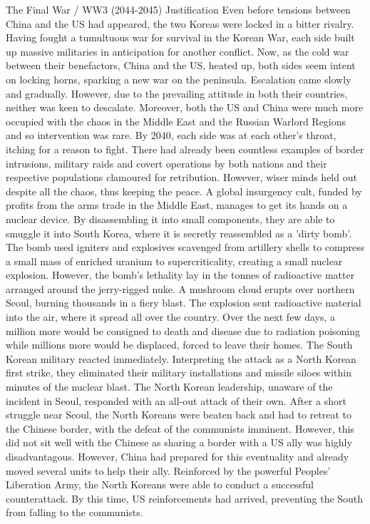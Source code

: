     The Final War / WW3 (2044-2045)
        Justification
            Even before tensions between China and the US had appeared, the two Koreas were locked in a bitter rivalry. Having fought a tumultuous war for survival in the Korean War, each side built up massive militaries in anticipation for another conflict. Now, as the cold war between their benefactors, China and the US, heated up, both sides seem intent on locking horns, sparking a new war on the peninsula.
            Escalation came slowly and gradually. However, due to the prevailing attitude in both their countries, neither was keen to descalate. Moreover, both the US and China were much more occupied with the chaos in the Middle East and the Russian Warlord Regions and so intervention was rare.
            By 2040, each side was at each other's throat, itching for a reason to fight. There had already been countless examples of border intrusions, military raids and covert operations by both nations and their respective populations clamoured for retribution. However, wiser minds held out despite all the chaos, thus keeping the peace.
            A global insurgency cult, funded by profits from the arms trade in the Middle East, manages to get its hands on a nuclear device. By disassembling it into small components, they are able to smuggle it into South Korea, where it is secretly reassembled as a 'dirty bomb'. The bomb used igniters and explosives scavenged from artillery shells to compress a small mass of enriched uranium to supercriticality, creating a small nuclear explosion. However, the bomb's lethality lay in the tonnes of radioactive matter arranged around the jerry-rigged nuke.
            A mushroom cloud erupts over northern Seoul, burning thousands in a fiery blast. The explosion sent radioactive material into the air, where it spread all over the country. Over the next few days, a million more would be consigned to death and disease due to radiation poisoning while millions more would be displaced, forced to leave their homes.
            The South Korean military reacted immediately. Interpreting the attack as a North Korean first strike, they eliminated their military installations and missile siloes within minutes of the nuclear blast. The North Korean leadership, unaware of the incident in Seoul, responded with an all-out attack of their own.
            After a short struggle near Seoul, the North Koreans were beaten back and had to retreat to the Chinese border, with the defeat of the communists imminent. However, this did not sit well with the Chinese as sharing a border with a US ally was highly disadvantagous. However, China had prepared for this eventuality and already moved several units to help their ally. Reinforced by the powerful Peoples' Liberation Army, the North Koreans were able to conduct a successful counterattack. By this time, US reinforcements had arrived, preventing the South from falling to the communists.
